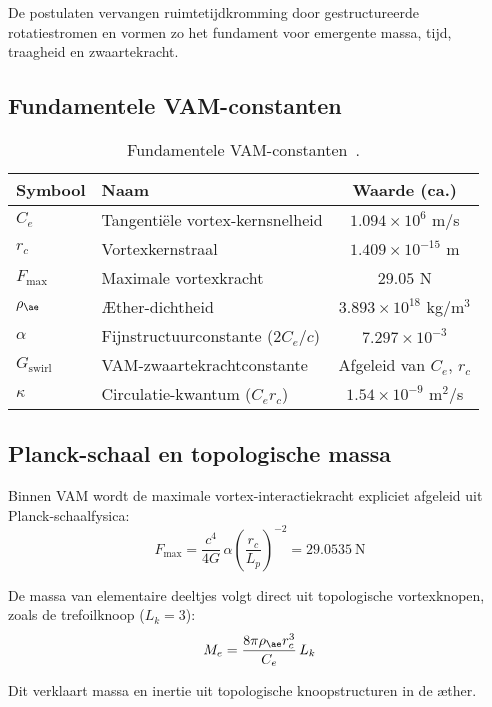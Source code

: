 De postulaten vervangen ruimtetijdkromming door gestructureerde rotatiestromen en vormen zo het fundament voor emergente massa, tijd, traagheid en zwaartekracht.

\subsection*{Fundamentele VAM-constanten}

\begin{table}[htbp]
    \centering
    \begin{tabular}{llc}
        \hline
        \toprule
        \textbf{Symbool} & \textbf{Naam} & \textbf{Waarde (ca.)} \\
        \hline
        \midrule
        $C_e$ & Tangentiële vortex-kernsnelheid & $1.094 \times 10^6$ m/s \\
        $r_c$ & Vortexkernstraal & $1.409 \times 10^{-15}$ m \\
        $F_{\text{max}}$ & Maximale vortexkracht & $29.05$ N \\
        $\rho_{\ae}$ & Æther-dichtheid & $3.893 \times 10^{18}$ kg/m$^3$ \\
        $\alpha$ & Fijnstructuurconstante ($2 C_e/c$) & $7.297 \times 10^{-3}$\\
        $G_{\text{swirl}}$ & VAM-zwaartekrachtconstante & Afgeleid van $C_e$, $r_c$\\
        $\kappa$ & Circulatie-kwantum ($C_e r_c$) & $1.54 \times 10^{-9}$ m$^2$/s \\
        \hline
        \bottomrule
    \end{tabular}
    \caption{Fundamentele VAM-constanten~\cite{vam2025field}.}
    \label{tab:constants}
\end{table}

\subsection*{Planck-schaal en topologische massa}

Binnen VAM wordt de maximale vortex-interactiekracht expliciet afgeleid uit Planck-schaalfysica:
\[
F_{\text{max}} = \frac{c^4}{4G}\,\alpha\left(\frac{r_c}{L_p}\right)^{-2} = 29.0535~\text{N}
\]

De massa van elementaire deeltjes volgt direct uit topologische vortexknopen, zoals de trefoilknoop ($L_k=3$):
\[
M_e = \frac{8\pi \rho_{\ae} r_c^3}{C_e}\, L_k
\]

Dit verklaart massa en inertie uit topologische knoopstructuren in de æther.

